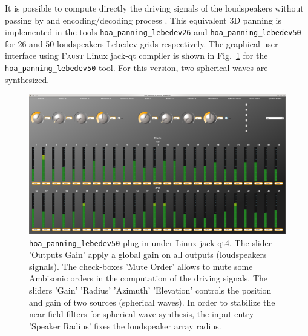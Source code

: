 \documentclass[10pt,a4paper]{article}
\begin{document}
It is possible to compute directly the driving signals of the loudspeakers without passing by and encoding/decoding process \cite{lecomte2015on}. This equivalent 3D panning is implemented in the tools \lstinline'hoa_panning_lebedev26' and \lstinline'hoa_panning_lebedev50' for 26 and 50 loudspeakers Lebedev grids respectively.
The graphical user interface using \textsc{Faust} Linux jack-qt compiler is shown in Fig.~\ref{fig:hoa_panning_lebedev50} for the \lstinline'hoa_panning_lebedev50' tool. For this version, two spherical waves are synthesized.
\begin{figure}[!ht]
\includegraphics[width=\columnwidth]{hoa_panning_lebedev50.png}
\caption{\lstinline'hoa_panning_lebedev50' plug-in under Linux jack-qt4. The slider 'Outputs Gain' apply a global gain on all outputs (loudspeakers signals). The check-boxes 'Mute Order' allows to mute some Ambisonic orders in the computation of the driving signals. The sliders 'Gain' 'Radius' 'Azimuth' 'Elevation' controls the position and gain of two sources (spherical waves). In order to stabilize the near-field filters for spherical wave synthesis, the input entry 'Speaker Radius' fixes the loudspeaker array radius.}
\label{fig:hoa_panning_lebedev50}
\end{figure}

\pagebreak
\end{document}
